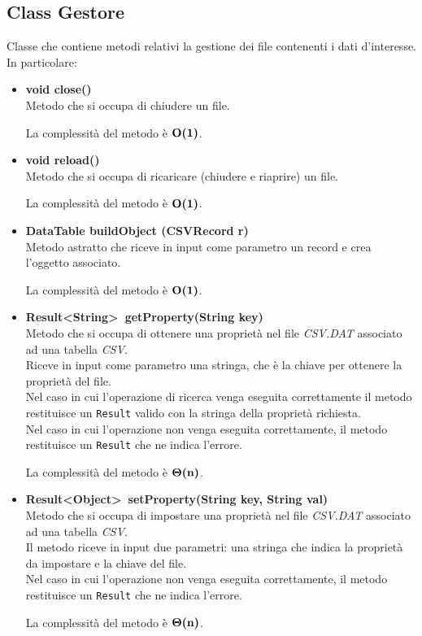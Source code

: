 \documentclass[a4paper, 12pt]{scrreprt}
\begin{document}
			\subsection{Class Gestore}
			Classe che contiene metodi relativi la gestione dei file contenenti i dati d'interesse. In particolare:
			\begin{itemize}
				\item \textbf{void close()}
				\\Metodo che si occupa di chiudere un file.
				
				La complessit\`a del metodo \`e $\mathbf{O}\textbf{(1)}$.
				
				\item \textbf{void reload()}
				\\Metodo che si occupa di ricaricare (chiudere e riaprire) un file.
				
				La complessit\`a del metodo \`e $\mathbf{O}\textbf{(1)}$.

				\item \textbf {DataTable buildObject (CSVRecord r)}
				\\Metodo astratto che riceve in input come parametro un record e crea l'oggetto associato.
				
				La complessit\`a del metodo \`e $\mathbf{O}\textbf{(1)}$.
\pagebreak
				\item \textbf{Result\textless String\textgreater~getProperty(String key)}
				\\Metodo che si occupa di ottenere una propriet\`a nel file\textsl{ CSV.DAT} associato ad una tabella \textsl{CSV}.
				\\Riceve in input come parametro una stringa, che \`e la chiave per ottenere la propriet\`a del file.
				\\Nel caso in cui l'operazione di ricerca venga eseguita correttamente il metodo restituisce un \verb!Result! valido con la stringa della propriet\`a richiesta.
				\\Nel caso in cui l'operazione non venga eseguita correttamente, il metodo restituisce un \verb!Result! che ne indica l'errore.
				
				La complessit\`a del metodo \`e $\mathbf{\Theta}\textbf{(n)}$.

				\item \textbf{Result\textless Object\textgreater~setProperty(String key, String val)}
				\\Metodo che si occupa di impostare una propriet\`a nel file \textsl{CSV.DAT} associato ad una tabella \textsl{CSV}.
				\\Il metodo riceve in input due parametri: una stringa che indica la propriet\`a da impostare e la chiave del file.
				\\Nel caso in cui l'operazione non venga eseguita correttamente, il metodo restituisce un \verb!Result! che ne indica l'errore.
				
				La complessit\`a del metodo \`e $\mathbf{\Theta}\textbf{(n)}$.
				
			\end{itemize}
\end{document}

